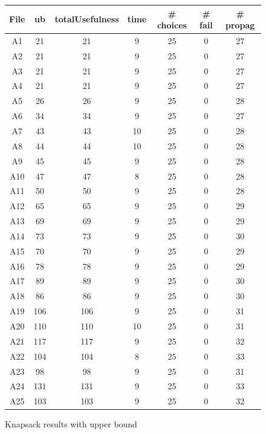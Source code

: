 \documentclass[a4paper ,12pt,french]{article}
\begin{document}
\begin{figure}[!ht]
\begin{tabular}{|c|c|c|c|c|c|c|}
\hline
File & ub & totalUsefulness & time & \# choices & \# fail & \# propag\\
\hline
\hline
A1 & 21 & 21 & 9 & 25 & 0 & 27\\
\hline
A2& 21& 21& 9&25&    0& 27\\
\hline
A3& 21& 21& 9&25&    0& 27\\
\hline
A4& 21& 21& 9&25&    0& 27\\
\hline
A5& 26& 26& 9&25&    0& 28\\
\hline
A6& 34& 34& 9&25&    0& 27\\
\hline
A7& 43& 43& 10&25&    0& 28\\
\hline
A8& 44& 44& 10&25&    0& 28\\
\hline
A9& 45& 45& 9&25&    0& 28\\
\hline
A10& 47& 47& 8&25&    0& 28\\
\hline
A11& 50& 50& 9&25&    0& 28\\
\hline
A12& 65& 65& 9&25&    0& 29\\
\hline
A13& 69& 69& 9&25&    0& 29\\
\hline
A14& 73& 73& 9&25&    0& 30\\
\hline
A15& 70& 70& 9&25&    0& 29\\
\hline
A16& 78& 78& 9&25&    0& 29\\
\hline
A17& 89& 89& 9&25&    0& 30\\
\hline
A18& 86& 86& 9&25&    0& 30\\
\hline
A19& 106& 106& 9&25&    0& 31\\
\hline
A20& 110& 110& 10&25&    0& 31\\
\hline
A21& 117& 117& 9&25&    0& 32\\
\hline
A22& 104& 104& 8&25&    0& 33\\
\hline
A23& 98& 98& 9&25&    0& 31\\
\hline
A24& 131& 131& 9&25&    0& 33\\
\hline
A25& 103& 103& 9&25&    0& 32\\
\hline
\end{tabular}
\caption{Knapsack results with upper bound}
\label{FIGA}
\end{figure}
\end{document}
